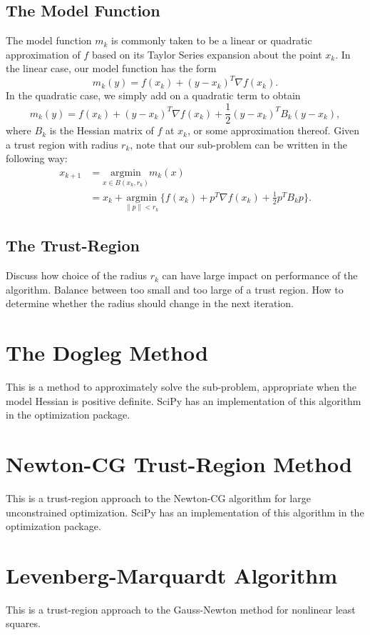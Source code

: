 \subsection*{The Model Function}
The model function $m_k$ is commonly taken to be a linear or quadratic approximation of
$f$ based on its Taylor Series expansion about the point $x_k$. In the linear case,
our model function has the form
\[
m_k(y) = f(x_k) + (y-x_k)^T \nabla f(x_k).
\] 
In the quadratic case, we simply add on a quadratic term to obtain
\[
m_k(y) = f(x_k) + (y-x_k)^T \nabla f(x_k) + \frac{1}{2}(y - x_k)^T B_k (y-x_k),
\]
where $B_k$ is the Hessian matrix of $f$ at $x_k$, or some approximation thereof.
Given a trust region with radius $r_k$, note that our sub-problem can be 
written in the following way:
\begin{align*}
x_{k+1} &= \underset{x \in B(x_k, r_k)}{\text{argmin}} m_k(x)\\
&= x_k + \underset{\|p\| < r_k}{\text{argmin}}\, \{f(x_k) + p^T \nabla f(x_k) + \frac{1}{2}p^T B_k p\}.
\end{align*}

\subsection*{The Trust-Region}
Discuss how choice of the radius $r_k$ can have large impact on performance of the algorithm. Balance between
too small and too large of a trust region. How to determine whether the radius should change in the next iteration.

\section*{The Dogleg Method}
This is a method to approximately solve the sub-problem, appropriate when the model Hessian is positive definite.
SciPy has an implementation of this algorithm in the optimization package.


\section*{Newton-CG Trust-Region Method}
This is a trust-region approach to the Newton-CG algorithm for large unconstrained optimization.
SciPy has an implementation of this algorithm in the optimization package.

\section*{Levenberg-Marquardt Algorithm}
This is a trust-region approach to the Gauss-Newton method for nonlinear least squares.
